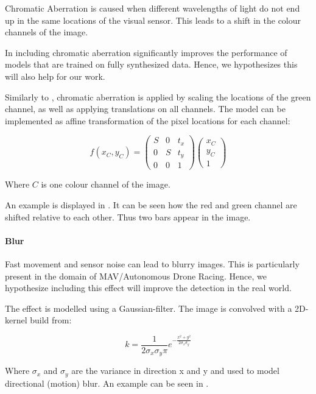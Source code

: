 Chromatic Aberration is caused when different wavelengths of light do not end up in the same locations of the visual sensor. This leads to a shift in the colour channels of the image.

In \cite{Carlson2018} including chromatic aberration significantly improves the performance of models that are trained on fully synthesized data. Hence, we hypothesizes this will also help for our work.

Similarly to \cite{Carlson2018}, chromatic aberration is applied by scaling the locations of the green channel, as well as applying translations on all channels. The model can be implemented as affine transformation of the pixel locations for each channel:

\begin{equation}
f(x_C,y_C) = \begin{pmatrix}
S & 0 & t_x \\
0 & S & t_y \\
0 & 0 & 1
\end{pmatrix} \begin{pmatrix}
x_C \\
y_C \\
1
\end{pmatrix}
\end{equation}

Where $C$ is one colour channel of the image.

An example is displayed in . It can be seen how the red and green channel are shifted relative to each other. Thus two bars appear in the image.

\paragraph{Blur}

Fast movement and sensor noise can lead to blurry images. This is particularly present in the domain of \ac{MAV}/Autonomous Drone Racing. Hence, we hypothesize including this effect will improve the detection in the real world. 

The effect is modelled using a Gaussian-filter. The image is convolved with a 2D-kernel build from:

\begin{equation}
k = \frac{1}{2\sigma_x\sigma_y\pi}e^{-{\frac{x^2 + y^2}{2\sigma_x\sigma_y}}} 
\end{equation}

Where $\sigma_x$ and $\sigma_y$ are the variance in direction x and y and used to model directional (motion) blur. An example can be seen in .

